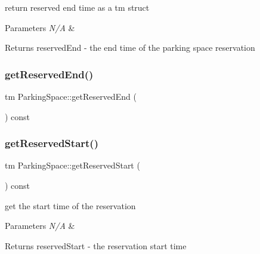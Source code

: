 return reserved end time as a tm struct 


\begin{DoxyParams}{Parameters}
{\em N/A} & \\
\hline
\end{DoxyParams}
\begin{DoxyReturn}{Returns}
reserved\+End -\/ the end time of the parking space reservation 
\end{DoxyReturn}
\mbox{\label{class_parking_space_a9048ab587b0287dabfa0f8cc202e8bb5}} 
\subsubsection{\texorpdfstring{get\+Reserved\+End()}{getReservedEnd()}\hspace{0.1cm}{\footnotesize\ttfamily [2/2]}}
{\footnotesize\ttfamily tm Parking\+Space\+::get\+Reserved\+End (\begin{DoxyParamCaption}{ }\end{DoxyParamCaption}) const}

\mbox{\label{class_parking_space_a83b660966c8ed21827b961d4e084c183}} 
\subsubsection{\texorpdfstring{get\+Reserved\+Start()}{getReservedStart()}\hspace{0.1cm}{\footnotesize\ttfamily [1/2]}}
{\footnotesize\ttfamily tm Parking\+Space\+::get\+Reserved\+Start (\begin{DoxyParamCaption}{ }\end{DoxyParamCaption}) const}



get the start time of the reservation 


\begin{DoxyParams}{Parameters}
{\em N/A} & \\
\hline
\end{DoxyParams}
\begin{DoxyReturn}{Returns}
reserved\+Start -\/ the reservation start time 
\end{DoxyReturn}
\mbox{\label{class_parking_space_a83b660966c8ed21827b961d4e084c183}} 
